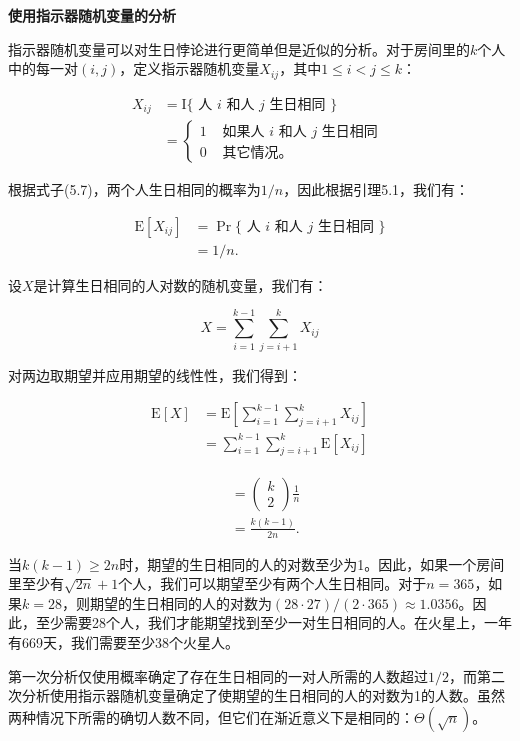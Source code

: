 \documentclass[lang=cn,newtx,10pt,scheme=chinese]{elegantbook}
\begin{document}
\textbf{使用指示器随机变量的分析}

指示器随机变量可以对生日悖论进行更简单但是近似的分析。对于房间里的$k$个人中的每一对$(i,j)$，定义指示器随机变量$X_{ij}$，其中$1\leq i<j\leq k$：

$$
\begin{aligned}
X_{i j} & =\mathrm{I} \{\text { 人 } i \text { 和人 } j \text { 生日相同 }\} \\
& = \begin{cases}1 & \text { 如果人 } i \text { 和人 } j \text { 生日相同 } \\
0 & \text { 其它情况。 }\end{cases}
\end{aligned}
$$

根据式子(5.7)，两个人生日相同的概率为$1/n$，因此根据引理5.1，我们有：

$$
\begin{aligned}
\mathrm{E}[X_{i j}] & =\operatorname{Pr}\{\text { 人 } i \text { 和人 } j \text { 生日相同 }\} \\
& =1 / n .
\end{aligned}
$$

设$X$是计算生日相同的人对数的随机变量，我们有：

$$
X=\sum_{i=1}^{k-1} \sum_{j=i+1}^k X_{i j}
$$

对两边取期望并应用期望的线性性，我们得到：

$$
\begin{aligned}
\mathrm{E}[X] & =\mathrm{E}[\sum_{i=1}^{k-1} \sum_{j=i+1}^k X_{i j}] \\
& =\sum_{i=1}^{k-1} \sum_{j=i+1}^k \mathrm{E}[X_{i j}]
\end{aligned}
$$

$$
\begin{aligned}
& =(\begin{array}{l}
k \\
2
\end{array}) \frac{1}{n} \\
& =\frac{k(k-1)}{2 n} .
\end{aligned}
$$

当$k(k-1)\geq 2n$时，期望的生日相同的人的对数至少为1。因此，如果一个房间里至少有$\sqrt{2n}+1$个人，我们可以期望至少有两个人生日相同。对于$n=365$，如果$k=28$，则期望的生日相同的人的对数为$(28\cdot 27)/(2\cdot 365)\approx 1.0356$。因此，至少需要28个人，我们才能期望找到至少一对生日相同的人。在火星上，一年有669天，我们需要至少38个火星人。

第一次分析仅使用概率确定了存在生日相同的一对人所需的人数超过$1/2$，而第二次分析使用指示器随机变量确定了使期望的生日相同的人的对数为1的人数。虽然两种情况下所需的确切人数不同，但它们在渐近意义下是相同的：$\Theta(\sqrt{n})$。
\end{document}

